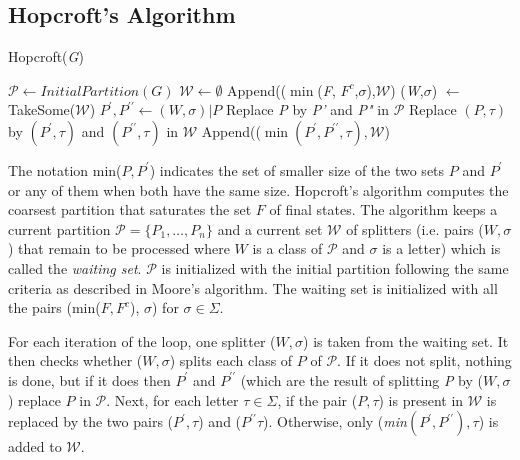 {\subsection{Hopcroft's Algorithm}

\begin{algorithm} 
  \caption{Hopcroft(\textit{G})\label{alg:hop}}
    \begin{algorithmic}[1]
      \State $\mathcal{P} \leftarrow InitialPartition(G)$
      \State $\mathcal{W} \leftarrow \emptyset$
      \ForAll{$\sigma \in \Sigma$}
      	\State Append(($\min$(\textit{F}, $F^c$,$\sigma$),$\mathcal{W}$)
      		\State (\textit{W},$\sigma$) $\leftarrow$ TakeSome($\mathcal{W}$)
				\State $P^{\prime}, P^{\prime\prime} \leftarrow (W,\sigma)|P$      		
				Replace \textit{P} by \textit{P'} and \textit{P"} in $\mathcal{P}$
				\ForAll{$\tau \in \Sigma$}
						\State Replace $(P,\tau)$ by $(P^{\prime},\tau)$ and $(P^{\prime\prime},\tau)$ in $\mathcal{W}$
					\Else
						\State Append(($\min(P^{\prime}, P^{\prime\prime},\tau),\mathcal{W}$)				
					\EndIf				
				\EndFor 
      		\EndFor
      	\EndWhile
      \EndFor
    \end{algorithmic}
  \end{algorithm}

The notation min($P,P^{\prime}$) indicates the set of smaller size of the two sets $P$ and $P^{\prime}$ or any of them when both have the same size. Hopcroft's algorithm computes the coarsest partition that saturates the set $F$ of final states. The algorithm keeps a current partition $\mathcal{P} = \{P_1, \ldots, P_n\}$ and a current set $\mathcal{W}$ of splitters (i.e. pairs ($W, \sigma$) that remain to be processed where $W$ is a class of $\mathcal{P}$ and $\sigma$ is a letter) which is called the \textit{waiting set}. $\mathcal{P}$ is initialized with the initial partition following the same criteria as described in Moore's algorithm. The waiting set is initialized with all the pairs (min($F, F^c$), $\sigma$) for $\sigma\in\Sigma$.

For each iteration of the loop, one splitter ($W,\sigma$) is taken from the waiting set. It then checks whether ($W, \sigma$) splits each class of $P$ of $\mathcal{P}$. If it does not split, nothing is done, but if it does then $P^{\prime}$ and $P^{\prime\prime}$ (which are the result of splitting \textit{P} by ($W,\sigma$) replace $P$ in $\mathcal{P}$. Next, for each letter $\tau\in\Sigma$, if the pair ($P,\tau$) is present in $\mathcal{W}$ is replaced by the two pairs ($P^{\prime},\tau$) and ($P^{\prime\prime}\tau$). Otherwise, only (\textit{min}$(P^{\prime},P^{\prime\prime}),\tau$) is added to $\mathcal{W}$.

}
